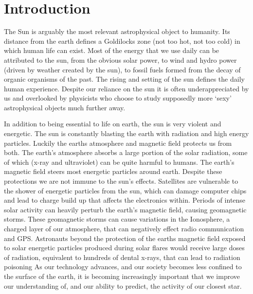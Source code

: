 \chapter{Introduction}\label{CH:introduction}


The Sun is arguably the most relevant astrophysical object to humanity.
Its distance from the earth defines a Goldilocks zone (not too hot, not too cold) in which human life can exist.
Most of the energy that we use daily can be attributed to the sun, from the obvious solar power, to wind and hydro power (driven by weather created by the sun), to fossil fuels formed from the decay of organic organisms of the past.
The rising and setting of the sun defines the daily human experience.
Despite our reliance on the sun it is often underappreciated by us and overlooked by physicists who choose to study supposedly more `sexy' astrophysical objects much further away.

In addition to being essential to life on earth, the sun is very violent and energetic.
The sun is constantly blasting the earth with radiation and high energy particles.
Luckily the earths atmosphere and magnetic field protects us from both.
The earth's atmosphere absorbs a large portion of the solar radiation, some of which (x-ray and ultraviolet) can be quite harmful to humans.
The earth's magnetic field steers most energetic particles around earth.
Despite these protections we are not immune to the sun's effects.
Satellites are vulnerable to the shower of energetic particles from the sun, which can damage computer chips and lead to charge build up that affects the electronics within.
Periods of intense solar activity can heavily perturb the earth's magnetic field, causing geomagnetic storms.
These geomagnetic storms can cause variations in the Ionosphere, a charged layer of our atmosphere, that can negatively effect radio communication and GPS.
Astronauts beyond the protection of the earths magnetic field exposed to solar energetic particles produced during solar flares would receive large doses of radiation, equivalent to hundreds of dental x-rays, that can lead to radiation poisoning \citep[][and references therein]{Temmer2021}
As our technology advances, and our society becomes less confined to the surface of the earth, it is becoming increasingly important that we improve our understanding of, and our ability to predict, the activity of our closest star.

